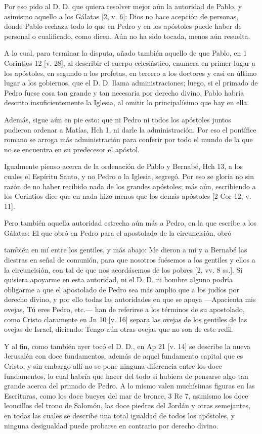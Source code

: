 Por eso pido al D. D. que quiera resolver mejor aún la autoridad de Pablo, y asimismo aquello a los Gálatas [2, v. 6]: Dios no hace acepción de personas, donde Pablo rechaza todo lo que en Pedro y en los apóstoles puede haber de personal o cualificado, como dicen. Aún no ha sido tocada, menos aún resuelta.

A lo cual, para terminar la disputa, añado también aquello de que Pablo, en 1 Corintios 12 [v. 28], al describir el cuerpo eclesiástico, enumera en primer lugar a los apóstoles, en segundo a los profetas, en tercero a los doctores y casi en último lugar a los gobiernos, que el D. D. llama administraciones; luego, si el primado de Pedro fuese cosa tan grande y tan necesaria por derecho divino, Pablo habría descrito insuficientemente la Iglesia, al omitir lo principalísimo que hay en ella.

Además, sigue aún en pie esto: que ni Pedro ni todos los apóstoles juntos pudieron ordenar a Matías, Hch 1, ni darle la administración. Por eso el pontífice romano se arroga más administración para conferir por todo el mundo de la que no se encuentra en su predecesor el apóstol.

Igualmente pienso acerca de la ordenación de Pablo y Bernabé, Hch 13, a los cuales el Espíritu Santo, y no Pedro o la Iglesia, segregó. Por eso se gloría no sin razón de no haber recibido nada de los grandes apóstoles; más aún, escribiendo a los Corintios dice que en nada hizo menos que los demás apóstoles [2 Cor 12, v. 11].

Pero también aquella autoridad estrecha aún más a Pedro, en la que escribe a los Gálatas: El que obró en Pedro para el apostolado de la circuncisión, obró

también en mí entre los gentiles, y más abajo: Me dieron a mí y a Bernabé las diestras en señal de comunión, para que nosotros fuésemos a los gentiles y ellos a la circuncisión, con tal de que nos acordásemos de los pobres [2, vv. 8 ss.]. Si quisiera apoyarme en esta autoridad, ni el D. D. ni hombre alguno podría obligarme a que el apostolado de Pedro sea más amplio que a los judíos por derecho divino, y por ello todas las autoridades en que se apoya —Apacienta mis ovejas, Tú eres Pedro, etc.— han de referirse a los términos de su apostolado, como Cristo claramente en Jn 10 [v. 16] separa las ovejas de los gentiles de las ovejas de Israel, diciendo: Tengo aún otras ovejas que no son de este redil.

Y al fin, como también ayer tocó el D. D., en Ap 21 [v. 14] se describe la nueva Jerusalén con doce fundamentos, además de aquel fundamento capital que es Cristo, y sin embargo allí no se pone ninguna diferencia entre los doce fundamentos, lo cual habría que hacer del todo si hubiera de pensarse algo tan grande acerca del primado de Pedro. A lo mismo valen muchísimas figuras en las Escrituras, como los doce bueyes del mar de bronce, 3 Re 7, asimismo los doce leoncillos del trono de Salomón, las doce piedras del Jordán y otras semejantes, en todas las cuales se describe una total igualdad de todos los \marginpar{\small[315]} apóstoles, y ninguna desigualdad puede probarse en contrario por derecho divino.

